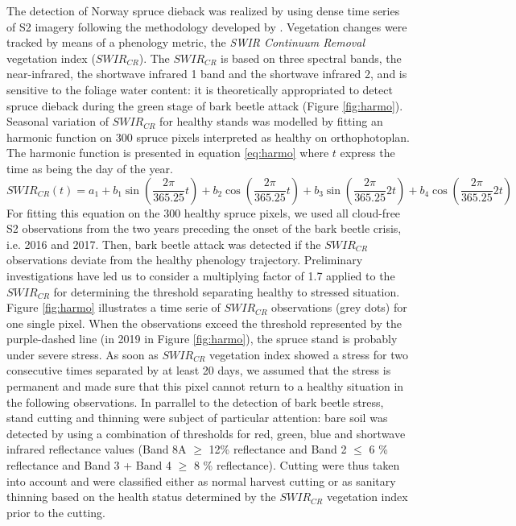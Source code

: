 \documentclass[3p,procedia]{elsarticle}
\begin{document}
The detection of Norway spruce dieback was realized by using dense time series of S2 imagery following the methodology developed by \cite{dutrieux_package_2021}.
Vegetation changes were tracked by means of a phenology metric, the \textit{SWIR Continuum Removal} vegetation index ($SWIR_{CR}$).
The $SWIR_{CR}$ is based on three spectral bands, the near-infrared, the shortwave infrared 1 band and the shortwave infrared 2, and is sensitive to the foliage water content: it is theoretically appropriated to detect spruce dieback during the green stage of bark beetle attack (Figure \ref{fig:harmo}).
Seasonal variation of $SWIR_{CR}$ for healthy stands was modelled by fitting an harmonic function on 300 spruce pixels interpreted as healthy on orthophotoplan. 
The harmonic function is presented in equation \ref{eq:harmo} where $t$ express the time as being the day of the year.
\begin{equation}\label{eq:harmo}
SWIR_{CR}(t) =   a_{1} + b_{1} \sin(\dfrac{2\pi}{365.25}t)+ b_{2} \cos(\dfrac{2\pi}{365.25}t)+ b_{3} \sin(\dfrac{2\pi}{365.25}2t)+ b_{4} \cos(\dfrac{2\pi}{365.25}2t)
\end{equation} 
For fitting this equation on the 300 healthy spruce pixels, we used all cloud-free S2 observations from the two years preceding the onset of the bark beetle crisis, i.e. 2016 and 2017.
Then, bark beetle attack was detected if the $SWIR_{CR}$ observations deviate from the healthy phenology trajectory. 
Preliminary investigations have led us to consider a multiplying factor of 1.7 applied to the $SWIR_{CR}$ for determining the threshold separating healthy to stressed situation.
Figure \ref{fig:harmo} illustrates a time serie of $SWIR_{CR}$ observations (grey dots) for one single pixel. 
When the observations exceed the threshold represented by the purple-dashed line (in 2019 in Figure \ref{fig:harmo}), the spruce stand is probably under severe stress.
As soon as $SWIR_{CR}$ vegetation index showed a stress for two consecutive times separated by at least 20 days, we assumed that the stress is permanent and made sure that this pixel cannot return to a healthy situation in the following observations.
In parrallel to the detection of bark beetle stress, stand cutting and thinning were subject of particular attention: 
bare soil was detected by using a combination of thresholds for red, green, blue and shortwave infrared reflectance values (Band 8A $\geq$ 12\% reflectance and Band 2 $\leq$ 6 \% reflectance and Band 3 + Band 4 $\geq$ 8 \% reflectance).
Cutting were thus taken into account and were classified either as normal harvest cutting or as sanitary thinning based on the health status determined by the $SWIR_{CR}$ vegetation index prior to the cutting.
\end{document}
